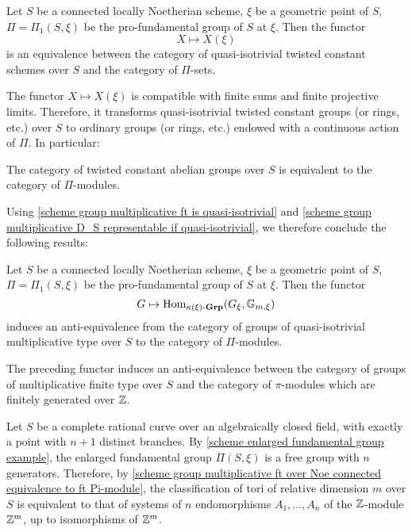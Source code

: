 \begin{proposition}\label{scheme twisted constant quasi-isotrivial over Noe connected equivalence to Pi-module}
Let $S$ be a connected locally Noetherian scheme, $\xi$ be a geometric point of $S$, $\Pi=\Pi_1(S,\xi)$ be the pro-fundamental group of $S$ at $\xi$. Then the functor
\[X\mapsto X(\xi)\]
is an equivalence between the category of quasi-isotrivial twisted constant schemes over $S$ and the category of $\Pi$-sets.
\end{proposition}

The functor $X\mapsto X(\xi)$ is compatible with finite sums and finite projective limits. Therefore, it transforms quasi-isotrivial twisted constant groups (or rings, etc.) over $S$ to ordinary groups (or rings, etc.) endowed with a continuous action of $\Pi$. In particular:

\begin{corollary}\label{scheme twisted constant group over Noe connected equivalence to Pi-module}
The category of twisted constant abelian groups over $S$ is equivalent to the category of $\Pi$-modules.
\end{corollary}

Using \cref{scheme group multiplicative ft is quasi-isotrivial} and \cref{scheme group multiplicative D_S representable if quasi-isotrivial}, we therefore conclude the following results:

\begin{theorem}\label{scheme group multiplicative quasi-isotrivial over Noe connected equivalence to Pi-module}
Let $S$ be a connected locally Noetherian scheme, $\xi$ be a geometric point of $S$, $\Pi=\Pi_1(S,\xi)$ be the pro-fundamental group of $S$ at $\xi$. Then the functor
\[G\mapsto\mathrm{Hom}_{\kappa(\xi)\textup{-}\mathbf{Grp}}(G_\xi,\mathbb{G}_{m,\xi})\]
induces an anti-equivalence from the category of groups of quasi-isotrivial multiplicative type over $S$ to the category of $\Pi$-modules.
\end{theorem}

\begin{corollary}\label{scheme group multiplicative ft over Noe connected equivalence to ft Pi-module}
The preceding functor induces an anti-equivalence between the category of groups of multiplicative finite type over $S$ and the category of $\pi$-modules which are finitely generated over $\mathbb{Z}$.
\end{corollary}

\begin{example}
Let $S$ be a complete rational curve over an algebraically closed field, with exactly a point with $n+1$ distinct branches. By \cref{scheme enlarged fundamental group example}, the enlarged fundamental group $\Pi(S,\xi)$ is a free group with $n$ generators. Therefore, by \cref{scheme group multiplicative ft over Noe connected equivalence to ft Pi-module}, the classification of tori of relative dimension $m$ over $S$ is equivalent to that of systems of $n$ endomorphisms $A_1,\dots,A_n$ of the $\mathbb{Z}$-module $\mathbb{Z}^m$, up to isomorphisms of $\mathbb{Z}^m$. 
\end{example}

